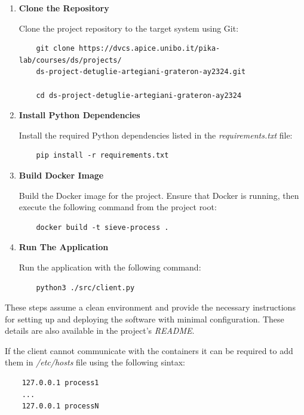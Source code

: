\documentclass{scrartcl}
\begin{document}
\begin{enumerate}
    \item \textbf{Clone the Repository}
    
    Clone the project repository to the target system using Git:
    
    \begin{verbatim}
    git clone https://dvcs.apice.unibo.it/pika-lab/courses/ds/projects/
    ds-project-detuglie-artegiani-grateron-ay2324.git
    
    cd ds-project-detuglie-artegiani-grateron-ay2324
    \end{verbatim}

    \item \textbf{Install Python Dependencies}
    
    Install the required Python dependencies listed in the \textit{requirements.txt }file:

    \begin{verbatim}
    pip install -r requirements.txt
    \end{verbatim}

    \item \textbf{Build Docker Image}
    
    Build the Docker image for the project. Ensure that Docker is running, then execute the following command from the project root:

    \begin{verbatim}
    docker build -t sieve-process .
    \end{verbatim}

    \item \textbf{Run The Application}
    
    Run the application with the following command:

    \begin{verbatim}
    python3 ./src/client.py
    \end{verbatim}

\end{enumerate}

These steps assume a clean environment and provide the necessary instructions for setting up and deploying the software with minimal configuration. These details are also available in the project's \textit{README}.

If the client cannot communicate with the containers it can be required to add them in \textit{/etc/hosts} file using the following sintax:

    \begin{verbatim}
    127.0.0.1 process1
    ...
    127.0.0.1 processN
    \end{verbatim}
\end{document}
